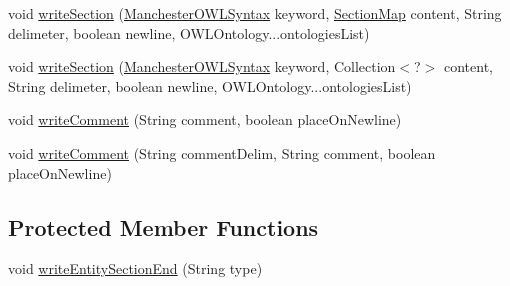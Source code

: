 \begin{DoxyCompactItemize}
void \hyperlink{classuk_1_1ac_1_1manchester_1_1cs_1_1owl_1_1owlapi_1_1mansyntaxrenderer_1_1_manchester_o_w_l_syntax_frame_renderer_a3f2fca07a73d6ce1e2573580c2b5b69a}{write\-Section} (\hyperlink{enumorg_1_1coode_1_1owlapi_1_1manchesterowlsyntax_1_1_manchester_o_w_l_syntax}{Manchester\-O\-W\-L\-Syntax} keyword, \hyperlink{classuk_1_1ac_1_1manchester_1_1cs_1_1owl_1_1owlapi_1_1mansyntaxrenderer_1_1_section_map}{Section\-Map} content, String delimeter, boolean newline, O\-W\-L\-Ontology...\-ontologies\-List)
\item 
void \hyperlink{classuk_1_1ac_1_1manchester_1_1cs_1_1owl_1_1owlapi_1_1mansyntaxrenderer_1_1_manchester_o_w_l_syntax_frame_renderer_aedad450f10eeb97c1b10daaf51725cf0}{write\-Section} (\hyperlink{enumorg_1_1coode_1_1owlapi_1_1manchesterowlsyntax_1_1_manchester_o_w_l_syntax}{Manchester\-O\-W\-L\-Syntax} keyword, Collection$<$?$>$ content, String delimeter, boolean newline, O\-W\-L\-Ontology...\-ontologies\-List)
\item 
void \hyperlink{classuk_1_1ac_1_1manchester_1_1cs_1_1owl_1_1owlapi_1_1mansyntaxrenderer_1_1_manchester_o_w_l_syntax_frame_renderer_a6358071a7d86524fa845a1ef218212ec}{write\-Comment} (String comment, boolean place\-On\-Newline)
\item 
void \hyperlink{classuk_1_1ac_1_1manchester_1_1cs_1_1owl_1_1owlapi_1_1mansyntaxrenderer_1_1_manchester_o_w_l_syntax_frame_renderer_a8e53f202f8445a09655d69ba4e938f83}{write\-Comment} (String comment\-Delim, String comment, boolean place\-On\-Newline)
\end{DoxyCompactItemize}
\subsection*{Protected Member Functions}
\begin{DoxyCompactItemize}
\item 
void \hyperlink{classuk_1_1ac_1_1manchester_1_1cs_1_1owl_1_1owlapi_1_1mansyntaxrenderer_1_1_manchester_o_w_l_syntax_frame_renderer_addb13be753466910608a489561e7a478}{write\-Entity\-Section\-End} (String type)
\end{DoxyCompactItemize}
